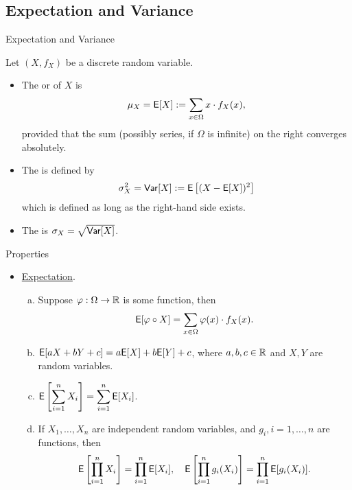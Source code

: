 \subsection{Expectation and Variance}

\begin{frame}{Expectation and Variance}

 Let $(X, f_X)$ be a discrete random variable.
\begin{itemize}
	\justifying
	\item The  or  of $X$ is 
	\begin{align*}
	\mu_X = \mathsf{E}[X] := \sum_{x\in \Omega} x\cdot f_X(x),
	\end{align*}
	provided that the sum (possibly series, if $\Omega$ is infinite) on the right converges absolutely.
	\item The  is defined by
	\begin{align*}
	\sigma_X^2 = \mathsf{Var}[X] := \mathsf{E}\left[(X - \mathsf{E}[X])^2 \right]
	\end{align*}
	which is defined as long as the right-hand side exists.
	\item The  is $\sigma_X = \sqrt{\mathsf{Var}[X]}$.
\end{itemize}

\end{frame}

\begin{frame}{Properties}

\begin{itemize}
	\justifying
	\item \underline{Expectation}.
	\justifying
	\begin{enumerate}[(a).]
		\justifying
		\item Suppose $\varphi: \Omega \rightarrow \mathbb{R}$ is some function, then
		\begin{align*}
		\mathsf{E}[\varphi\circ X] = \displaystyle \sum_{x\in \Omega} \varphi(x) \cdot f_X(x).
		\end{align*}
		\item $\mathsf{E}[aX + bY + c] = a\mathsf{E}[X] + b\mathsf{E}[Y] + c$, where $a, b, c\in \mathbb{R}$ and $X, Y$ are random variables.
		\item $\displaystyle\mathsf{E}\left[\sum_{i=1}^n X_i \right]  = \sum_{i=1}^n \mathsf{E}[X_i]$.
		\item If $X_1, \ldots, X_n$ are independent random variables, and $g_i, i = 1, \ldots, n$ are functions, then 
		\begin{align*}
		\mathsf{E}\left[\prod_{i=1}^n X_i \right] = \prod_{i=1}^n \mathsf{E}[X_i], \quad \mathsf{E}\left[\prod_{i=1}^n g_i(X_i) \right] = \prod_{i=1}^n \mathsf{E}[g_i(X_i)].
		\end{align*}
	\end{enumerate}
\end{itemize}


\end{frame}

